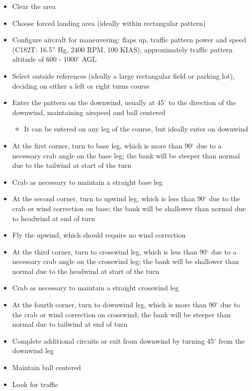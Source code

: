 \begin{itemize}
  \item Clear the area
  \item Choose forced landing area (ideally within rectangular pattern)
  \item Configure aircraft for maneuvering: flaps up, traffic pattern power and
    speed (C182T: 16.5'' Hg, 2400 RPM, 100 KIAS), approximately traffic pattern
    altitude of 600 - 1000' AGL
  \item Select outside references (ideally a large rectangular field or parking
    lot), deciding on either a left or right turns course 
  \item Enter the pattern on the downwind, usually at 45$^\circ$ to the
    direction of the downwind, maintaining airspeed and ball centered
    \begin{itemize}
      \item It can be entered on any leg of the course, but ideally enter on
        downwind
    \end{itemize}
  \item At the first corner, turn to base leg, which is more than 90$^\circ$
    due to a necessary crab angle on the base leg; the bank will be steeper
    than normal due to the tailwind at start of the turn
  \item Crab as necessary to maintain a straight base leg
  \item At the second corner, turn to upwind leg, which is less than 90$^\circ$
    due to the crab or wind correction on base; the bank will be shallower than
    normal due to headwind at end of turn
  \item Fly the upwind, which should require no wind correction
  \item At the third corner, turn to crosswind leg, which is less than
    90$^\circ$ due to a necessary crab angle on the crosswind leg; the bank
    will be shallower than normal due to the headwind at start of the turn
  \item Crab as necessary to maintain a straight crosswind leg
  \item At the fourth corner, turn to downwind leg, which is more than
    90$^\circ$ due to the crab or wind correction on crosswind; the bank will
    be steeper than normal due to tailwind at end of turn
  \item Complete additional circuits or exit from downwind by turning
    45$^\circ$ from the downwind leg
  \item Maintain ball centered
  \item Look for traffic
\end{itemize}

